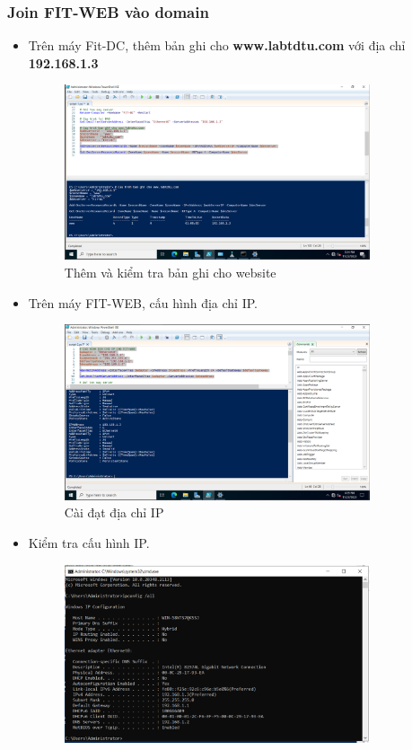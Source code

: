 \documentclass[13pt]{report}
\begin{document}
	\subsubsection{Join FIT-WEB vào domain}
	\begin{itemize}
		\item Trên máy Fit-DC, thêm bản ghi cho \textbf{www.labtdtu.com} với địa chỉ \textbf{192.168.1.3}
		\begin{figure}[htp]
			\centering
			\includegraphics[width=0.85\textwidth]{image/PowerShell/FIT-WEB/5.png}
			\caption{Thêm và kiểm tra bản ghi cho website}
		\end{figure}
		\item Trên máy FIT-WEB, cấu hình địa chỉ IP.
		\begin{figure}[htp]
			\centering
			\includegraphics[width=0.85\textwidth]{image/PowerShell/FIT-WEB/1.png}
			\caption{Cài đạt địa chỉ IP}
		\end{figure}
		\newpage
		\item Kiểm tra cấu hình IP.
		\begin{figure}[htp]
			\centering
			\includegraphics[width=0.85\textwidth]{image/PowerShell/FIT-WEB/2.png}

\end{figure}
\end{itemize}
\end{document}
